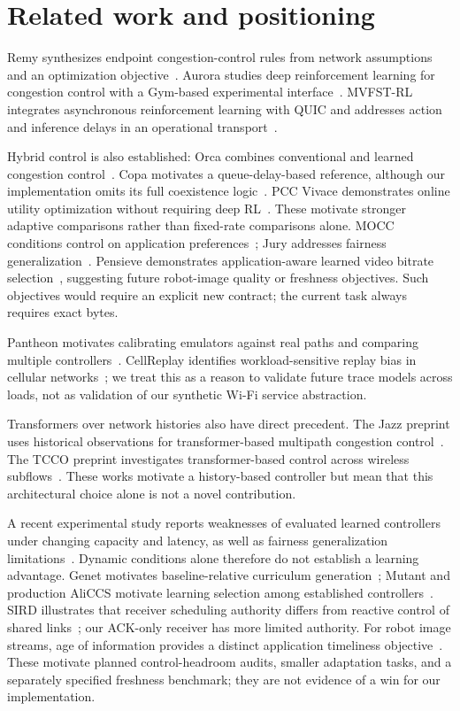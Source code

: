 \documentclass[11pt]{article}
\begin{document}
\section{Related work and positioning}
Remy synthesizes endpoint congestion-control rules from network assumptions and
an optimization objective~\cite{winstein2013remy}. Aurora studies deep reinforcement
learning for congestion control with a Gym-based experimental
interface~\cite{jay2019aurora}. MVFST-RL integrates asynchronous reinforcement
learning with QUIC and addresses action and inference delays in an operational
transport~\cite{sivakumar2019mvfst}.

Hybrid control is also established: Orca combines conventional and learned
congestion control~\cite{abbasloo2020orca}. Copa motivates a queue-delay-based
reference, although our implementation omits its full coexistence
logic~\cite{arun2018copa}. PCC Vivace demonstrates online utility optimization
without requiring deep RL~\cite{dong2018vivace}. These motivate stronger adaptive
comparisons rather than fixed-rate comparisons alone. MOCC conditions control on
application preferences~\cite{ma2022mocc}; Jury addresses fairness
generalization~\cite{tian2025jury}. Pensieve demonstrates application-aware learned
video bitrate selection~\cite{mao2017pensieve}, suggesting future robot-image
quality or freshness objectives. Such objectives would require an explicit new
contract; the current task always requires exact bytes.

Pantheon motivates calibrating emulators against real paths and comparing
multiple controllers~\cite{yan2018pantheon}. CellReplay identifies workload-sensitive
replay bias in cellular networks~\cite{sentosa2025cellreplay}; we treat this as a
reason to validate future trace models across loads, not as validation of our
synthetic Wi-Fi service abstraction.

Transformers over network histories also have direct precedent. The Jazz preprint
uses historical observations for transformer-based multipath congestion
control~\cite{wang2025jazz}. The TCCO preprint investigates transformer-based
control across wireless subflows~\cite{zhang2026tcco}. These works motivate a
history-based controller but mean that this architectural choice alone is not a
novel contribution.

A recent experimental study reports weaknesses of evaluated learned controllers
under changing capacity and latency, as well as fairness generalization
limitations~\cite{mazilu2026comparison}. Dynamic conditions alone therefore do
not establish a learning advantage. Genet motivates baseline-relative curriculum
generation~\cite{xia2022genet}; Mutant and production AliCCS motivate learning
selection among established controllers~\cite{pappone2025mutant,zeng2025aliccs}.
SIRD illustrates that receiver scheduling authority differs from reactive control
of shared links~\cite{prasopoulos2025sird}; our ACK-only receiver has more limited
authority. For robot image streams, age of information provides a distinct
application timeliness objective~\cite{yates2020aoi}. These motivate planned
control-headroom audits, smaller adaptation tasks, and a separately specified
freshness benchmark; they are not evidence of a win for our implementation.
\end{document}
